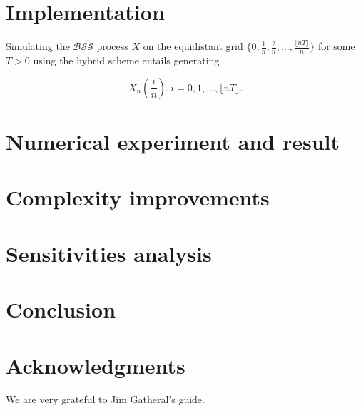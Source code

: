 \documentclass[12pt]{article}
\numberwithin{equation}{section}
\begin{document}
\section{Implementation}

	Simulating the $\mathcal{BSS}$ process $X$ on the equidistant grid $ \{0, \frac{1}{n}, \frac{2}{n}, \dots, \frac{\lfloor nT \rfloor}{n} \} $ for some $T>0$ using the hybrid scheme entails generating

  	\begin{equation}
  		X_n(\frac{i}{n}), i = 0, 1, \dots, \lfloor nT \rfloor.
  	\end{equation}

\subsection{}


\section{Numerical experiment and result}

\section{Complexity improvements}

\section{Sensitivities analysis}


\section{Conclusion}







\section*{Acknowledgments}

We are very grateful to Jim Gatheral's guide.
\end{document}
